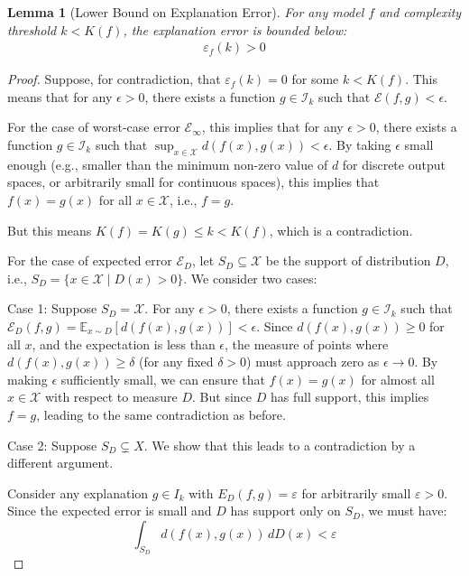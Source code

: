 \documentclass[11pt,letter,leqno]{article}
\newtheorem{lemma}[theorem]{Lemma}
\begin{document}
\begin{lemma}[Lower Bound on Explanation Error]
\label{lemma:lower-bound}
For any model $f$ and complexity threshold $k < K(f)$, the explanation error is bounded below:
\begin{align}
\varepsilon_f(k) > 0
\end{align}
\end{lemma}

\begin{proof}
Suppose, for contradiction, that $\varepsilon_f(k) = 0$ for some $k < K(f)$.  This means that for any $\epsilon > 0$, there exists a function $g \in \mathcal{I}_k$ such that $\mathcal{E}(f, g) < \epsilon$.

For the case of worst-case error $\mathcal{E}_{\infty}$, this implies that for any $\epsilon > 0$, there exists a function $g \in \mathcal{I}_k$ such that $\sup_{x \in \mathcal{X}} d(f(x), g(x)) < \epsilon$. By taking $\epsilon$ small enough (e.g., smaller than the minimum non-zero value of $d$ for discrete output spaces, or arbitrarily small for continuous spaces), this implies that $f(x) = g(x)$ for all $x \in \mathcal{X}$, i.e., $f = g$.

But this means $K(f) = K(g) \leq k < K(f)$, which is a contradiction.

For the case of expected error $\mathcal{E}_D$, let $S_D \subseteq \mathcal{X}$ be the support of distribution $D$, i.e., $S_D = \{x \in \mathcal{X} \mid D(x) > 0\}$.  We consider two cases:

Case 1: Suppose $S_D = \mathcal{X}$.  For any $\epsilon > 0$, there exists a function $g \in \mathcal{I}_k$ such that $\mathcal{E}_D(f, g) = \mathbb{E}_{x \sim D}[d(f(x), g(x))] < \epsilon$.  Since $d(f(x), g(x)) \geq 0$ for all $x$, and the expectation is less than $\epsilon$, the measure of points where $d(f(x), g(x)) \geq \delta$ (for any fixed $\delta > 0$) must approach zero as $\epsilon \to 0$.  By making $\epsilon$ sufficiently small, we can ensure that $f(x) = g(x)$ for almost all $x \in \mathcal{X}$ with respect to measure $D$.  But since $D$ has full support, this implies $f = g$, leading to the same contradiction as before.

Case 2: Suppose $S_D \subsetneq X$. We show that this leads to a contradiction by a different argument.

Consider any explanation $g \in I_k$ with $E_D(f, g) = \varepsilon$ for arbitrarily small $\varepsilon > 0$. Since the expected error is small and $D$ has support only on $S_D$, we must have:
\begin{equation}
\int_{S_D} d(f(x), g(x)) \, dD(x) < \varepsilon
\end{equation}


\end{proof}
\end{document}
